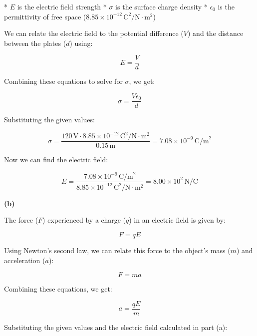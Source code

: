 \documentclass{article}
\begin{document}
* $E$ is the electric field strength
* $\sigma$ is the surface charge density
* $\epsilon_0$ is the permittivity of free space ($8.85 \times 10^{-12} \, \text{C}^2/\text{N} \cdot \text{m}^2$)

We can relate the electric field to the potential difference ($V$) and the distance between the plates ($d$) using:

\begin{equation*}
E = \frac{V}{d}
\end{equation*}

Combining these equations to solve for $\sigma$, we get:

\begin{equation*}
\sigma = \frac{V \epsilon_0}{d} 
\end{equation*}

Substituting the given values:

\begin{equation*}
\sigma = \frac{120 \, \text{V} \cdot 8.85 \times 10^{-12} \, \text{C}^2/\text{N} \cdot \text{m}^2}{0.15 \, \text{m}} = 7.08 \times 10^{-9} \, \text{C/m}^2
\end{equation*}

Now we can find the electric field:

\begin{equation*}
E = \frac{7.08 \times 10^{-9} \, \text{C/m}^2}{8.85 \times 10^{-12} \, \text{C}^2/\text{N} \cdot \text{m}^2} = \boxed{8.00 \times 10^2 \, \text{N/C}}
\end{equation*}

\textbf{(b)} 

The force ($F$) experienced by a charge ($q$) in an electric field is given by:

\begin{equation*}
F = qE
\end{equation*}

Using Newton's second law, we can relate this force to the object's mass ($m$) and acceleration ($a$):

\begin{equation*}
F = ma
\end{equation*}

Combining these equations, we get:

\begin{equation*}
a = \frac{qE}{m}
\end{equation*}

Substituting the given values and the electric field calculated in part (a):
\end{document}
